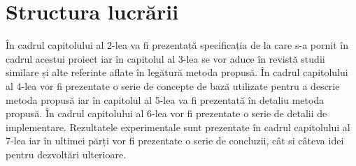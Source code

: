 \section{Structura lucrării}

În cadrul capitolului al 2-lea va fi prezentață specificația de la care s-a pornit în cadrul acestui proiect iar în capitolul al 3-lea se vor aduce în revistă studii similare și alte referinte aflate în legătură metoda propusă. În cadrul capitolului al 4-lea vor fi prezentate o serie de concepte de bază utilizate pentru a descrie metoda propusă iar în capitolul al 5-lea va fi prezentată în detaliu metoda propusă. În cadrul capitolului al 6-lea vor fi prezentate o serie de detalii de implementare. Rezultatele experimentale sunt prezentate în cadrul capitolului al 7-lea iar în ultimei părți vor fi prezentate o serie de concluzii, cât si câteva idei pentru dezvoltări ulterioare. 